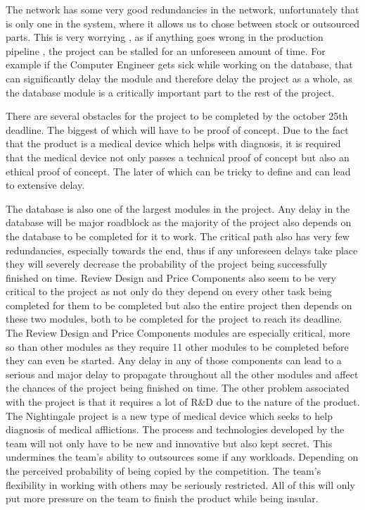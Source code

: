 \documentclass{article}
\begin{document}
The network has some very good redundancies in the network, unfortunately that is only one in the system, where it allows us to chose between stock or outsourced parts.
This is very worrying , as if anything goes wrong in the production pipeline , the project can be stalled for an unforeseen amount of time. For example if the Computer Engineer gets sick while working on the database, that can significantly delay the module and therefore delay the project as a whole, as the database module is a critically important part to the rest of the project.




There are several obstacles for the project to be completed by the october 25th deadline. The biggest of which will have to be proof of concept. Due to the fact that the product is a medical device which helps with diagnosis, it is required that the medical device not only passes a technical proof of concept but also an ethical proof of concept. The later of which can be tricky to define and can lead to extensive delay.


The database is also one of the largest modules in the project. Any delay in the database will be  major roadblock as the majority of the project also depends on the database to be completed for it to work.
The critical path also has very few redundancies, especially towards the end,  thus if any unforeseen delays take place they will severely decrease the probability of the project being successfully finished on time.
Review Design and Price Components also seem to be very critical to the project as not only do they depend on every other task being completed for them to be completed but also the entire project then depends on these two modules, both to be completed for the project to reach its deadline. The Review Design and Price Components modules are especially critical, more so than other modules as they require 11 other modules to be completed before they can even be started. Any delay in any of those components can lead to a serious and major delay to propagate throughout all the other modules and affect the chances of the project being finished on time.
The other problem associated with the project is that it requires a lot of R\&D due to the nature of the product. The Nightingale project is a new type of medical device which seeks to help diagnosis of medical afflictions. The process and technologies developed by the team will not only have to be new and innovative but also kept secret. This undermines the team's ability to outsources some if any workloads. Depending on the perceived probability of being copied by the competition. The team's flexibility in working with others may be seriously restricted. All of this will only put more pressure on the team to finish the product while being insular.
\end{document}
